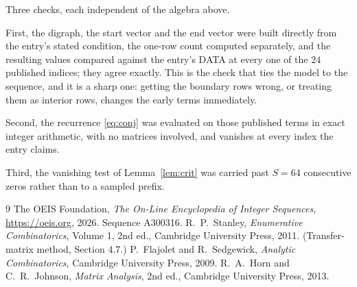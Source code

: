 \documentclass[11pt,a4paper]{article}
\theoremstyle{plain}
\theoremstyle{definition}
\begin{document}
Three checks, each independent of the algebra above.

First, the digraph, the start vector and the end vector were built directly from the
entry's stated condition, the one-row count computed separately, and the resulting values
compared against the entry's DATA at every one of the $24$ published indices; they
agree exactly. This is the check that ties the model to the sequence, and it is a sharp one:
getting the boundary rows wrong, or treating them as interior rows, changes the early terms
immediately.

Second, the recurrence \eqref{eq:conj} was evaluated on those published terms in exact
integer arithmetic, with no matrices involved, and vanishes at every index the entry claims.

Third, the vanishing test of Lemma~\ref{lem:crit} was carried past $S=64$ consecutive
zeros rather than to a sampled prefix.

\begin{thebibliography}{9}
 The OEIS Foundation, \emph{The On-Line Encyclopedia of Integer
Sequences}, \url{https://oeis.org}, 2026. Sequence A300316.
 R.~P.~Stanley, \emph{Enumerative Combinatorics}, Volume 1, 2nd ed.,
Cambridge University Press, 2011. (Transfer-matrix method, Section 4.7.)
 P.~Flajolet and R.~Sedgewick, \emph{Analytic Combinatorics}, Cambridge
University Press, 2009.
 R.~A.~Horn and C.~R.~Johnson, \emph{Matrix Analysis}, 2nd ed., Cambridge
University Press, 2013.
\end{thebibliography}
\end{document}

